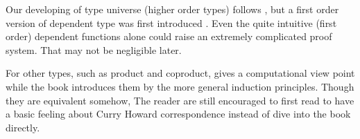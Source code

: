 Our developing of type universe (higher order types) follows 
\cite{homotopy-type-theory}, but a first order version of dependent type
was first introduced \cite{Curry-Howard}. Even the quite intuitive (first
order) dependent functions alone could raise an extremely complicated 
proof system. That may not be negligible later. 

For other types, such as product and coproduct, \cite{Curry-Howard} gives
a computational view point while the book \cite{homotopy-type-theory} introduces 
them by the more general induction principles. Though they are equivalent
somehow, The reader are still encouraged to first read \cite{Curry-Howard}
to have a basic feeling about Curry Howard correspondence instead of dive
into the book \cite{homotopy-type-theory} directly.
